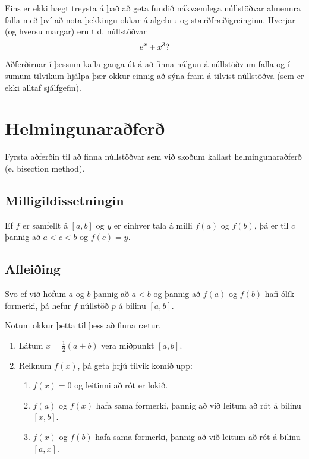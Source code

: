 \documentclass[letterpaper,10pt,icelandic]{sphinxmanual}
\begin{document}
Eins er ekki hægt treysta á það að geta fundið nákvæmlega núllstöðvar almennra falla með því
að nota þekkingu okkar á algebru og stærðfræðigreinginu. Hverjar (og hversu margar) eru t.d. núllstöðvar
\begin{gather}
\begin{split}e^x + x^3?\end{split}\notag
\end{gather}
Aðferðirnar í þessum kafla ganga út á að finna nálgun á núllstöðvum falla og í sumum tilvikum
hjálpa þær okkur einnig að sýna fram á tilvist núllstöðva (sem er ekki alltaf sjálfgefin).


\section{Helmingunaraðferð}
\label{kafli02:helmingunarafer}
Fyrsta aðferðin til að finna núllstöðvar sem við skoðum kallast
helmingunaraðferð (e. bisection method).


\subsection{Milligildissetningin}
\label{kafli02:milligildissetningin}
Ef \(f\) er samfellt á \([a,b]\) og \(y\) er einhver
tala á milli \(f(a)\) og \(f(b)\), þá er til \(c\)
þannig að \(a < c < b\) og \(f(c) = y\).


\subsection{Afleiðing}
\label{kafli02:afleiing}
Svo ef við höfum \(a\) og \(b\) þannig að \(a < b\) og
þannig að \(f(a)\) og \(f(b)\) hafi ólík formerki, þá hefur
\(f\) núllstöð \(p\) á bilinu \([a,b]\).

Notum okkur þetta til þess að finna rætur.
\begin{enumerate}
\item {} 
Látum \(x = \frac 12(a+b)\) vera miðpunkt \([a,b]\).

\item {} 
Reiknum \(f(x)\), þá geta þrjú tilvik komið upp:
\begin{enumerate}
\item {} 
\(f(x) = 0\) og leitinni að rót er lokið.

\item {} 
\(f(a)\) og \(f(x)\) hafa sama formerki, þannig að við
leitum að rót á bilinu \([x,b]\).

\item {} 
\(f(x)\) og \(f(b)\) hafa sama formerki, þannig að við
leitum að rót á bilinu \([a,x]\).

\end{enumerate}

\end{enumerate}
\end{document}
